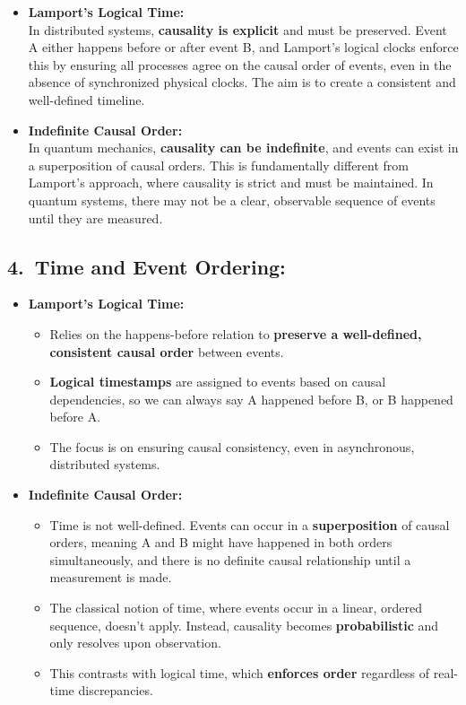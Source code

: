 \begin{itemize}[leftmargin=1.5em]
\item \textbf{Lamport’s Logical Time:}\\
  In distributed systems, \textbf{causality is explicit} and must be preserved. Event A either happens before or after event B, and Lamport’s logical clocks enforce this by ensuring all processes agree on the causal order of events, even in the absence of synchronized physical clocks. The aim is to create a consistent and well-defined timeline.
\item \textbf{Indefinite Causal Order:}\\
  In quantum mechanics, \textbf{causality can be indefinite}, and events can exist in a superposition of causal orders. This is fundamentally different from Lamport’s approach, where causality is strict and must be maintained. In quantum systems, there may not be a clear, observable sequence of events until they are measured.
\end{itemize}

\subsection*{4.\ Time and Event Ordering:}

\begin{itemize}[leftmargin=1.5em]
\item \textbf{Lamport’s Logical Time:}
  \begin{itemize}[leftmargin=1.25em]
  \item Relies on the happens-before relation to \textbf{preserve a well-defined, consistent causal order} between events.
  \item \textbf{Logical timestamps} are assigned to events based on causal dependencies, so we can always say A happened before B, or B happened before A.
  \item The focus is on ensuring causal consistency, even in asynchronous, distributed systems.
  \end{itemize}
\item \textbf{Indefinite Causal Order:}
  \begin{itemize}[leftmargin=1.25em]
  \item Time is not well-defined. Events can occur in a \textbf{superposition} of causal orders, meaning A and B might have happened in both orders simultaneously, and there is no definite causal relationship until a measurement is made.
  \item The classical notion of time, where events occur in a linear, ordered sequence, doesn’t apply. Instead, causality becomes \textbf{probabilistic} and only resolves upon observation.
  \item This contrasts with logical time, which \textbf{enforces order} regardless of real-time discrepancies.
  \end{itemize}
\end{itemize}

